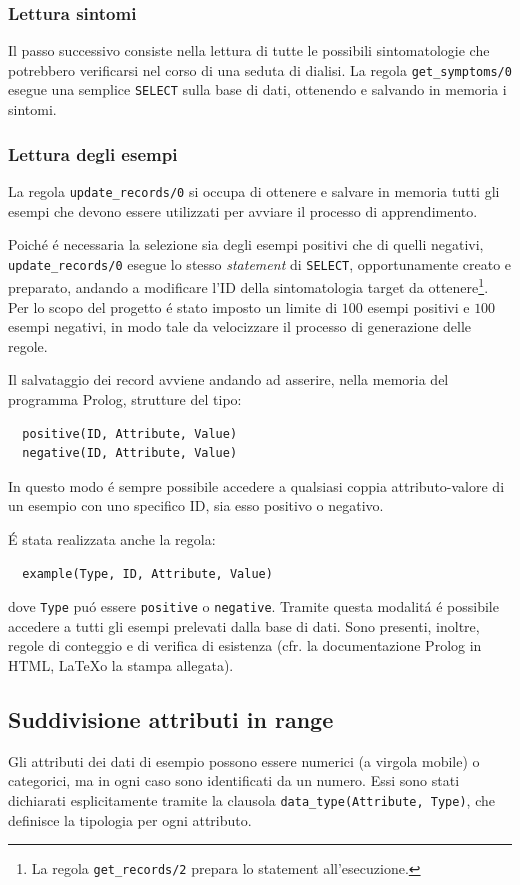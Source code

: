 \documentclass[preprint]{acm_proc_article-sp}
\begin{document}
\subsubsection{Lettura sintomi}
Il passo successivo consiste nella lettura di tutte le possibili sintomatologie che potrebbero verificarsi nel corso di una seduta di dialisi. La regola \verb|get_symptoms/0| esegue una semplice \texttt{SELECT} sulla base di dati, ottenendo e salvando in memoria i sintomi.

\subsubsection{Lettura degli esempi}
La regola \verb|update_records/0| si occupa di ottenere e salvare in memoria tutti gli esempi che devono essere utilizzati per avviare il processo di apprendimento.

Poich\'e \'e necessaria la selezione sia degli esempi positivi che di quelli negativi, \verb|update_records/0| esegue lo stesso \textit{statement} di \texttt{SELECT}, opportunamente creato e preparato, andando a modificare l'ID della sintomatologia target da ottenere\footnote{La regola \verb|get_records/2| prepara lo statement all'esecuzione.}. Per lo scopo del progetto \'e stato imposto un limite di $100$ esempi positivi e $100$ esempi negativi, in modo tale da velocizzare il processo di generazione delle regole.

Il salvataggio dei record avviene andando ad asserire, nella memoria del programma Prolog, strutture del tipo:
\begin{verbatim}
  positive(ID, Attribute, Value)
  negative(ID, Attribute, Value)
\end{verbatim}
In questo modo \'e sempre possibile accedere a qualsiasi coppia attributo-valore di un esempio con uno specifico ID, sia esso positivo o negativo.

\'E stata realizzata anche la regola:
\begin{verbatim}
  example(Type, ID, Attribute, Value)
\end{verbatim}
dove \verb|Type| pu\'o essere \verb|positive| o \verb|negative|. Tramite questa modalit\'a \'e possibile accedere a tutti gli esempi prelevati dalla base di dati. Sono presenti, inoltre, regole di conteggio e di verifica di esistenza (cfr. la documentazione Prolog in HTML, \LaTeX o la stampa allegata).

\subsection{Suddivisione attributi in range}
\label{prolog-categories}
Gli attributi dei dati di esempio possono essere numerici (a virgola mobile) o categorici, ma in ogni caso sono identificati da un numero. Essi sono stati dichiarati esplicitamente tramite la clausola \verb|data_type(Attribute, Type)|, che definisce la tipologia per ogni attributo.
\end{document}
